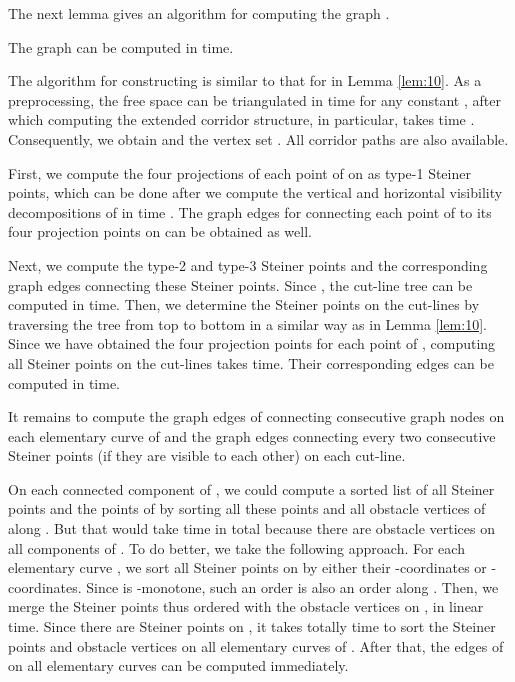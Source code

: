 \documentclass[english,runningheads,11pt]{llncs}
\newenvironment{proof}{\noindent {\textbf{Proof:}}\rm}{\hfill \rm}
\begin{document}
The next lemma gives an algorithm for computing the graph .

\begin{lemma}\label{lem:50}
The graph  can be computed in
 time.
\end{lemma}
\begin{proof}
The algorithm for constructing  is similar to that for  in Lemma \ref{lem:10}.
As a preprocessing, the free space  can be triangulated in
 time for any constant 
\cite{ref:Bar-YehudaTr94}, after which computing the extended corridor
structure, in particular, takes  time
\cite{ref:ChenA11ESA,ref:ChenCo12arXiv,ref:ChenL113STACS}.
Consequently, we obtain
 and the vertex set . All corridor paths are also available.

First, we compute the four projections of each point of
 on  as type-1 Steiner points, which can be
done after we compute the vertical and horizontal visibility
decompositions of  in  time
\cite{ref:Bar-YehudaTr94}. The graph edges for connecting each point
of  to its four projection points on  can
be obtained as well.

Next, we compute the type-2 and type-3 Steiner points and the corresponding graph edges
connecting these Steiner points. Since , the
cut-line tree  can be computed in  time.
Then, we determine the Steiner points on the cut-lines by traversing the tree  from top to bottom in a similar way as in Lemma \ref{lem:10}. Since we have obtained the four projection points for each point of , computing all Steiner
points on the cut-lines takes 
time. Their corresponding edges can be computed in  time.

It remains to compute the graph edges of  connecting consecutive
graph nodes on each elementary curve of  and the graph edges connecting
every two consecutive Steiner points (if they are visible to each other)
on each cut-line.

On each connected component  of , we could compute a sorted
list of all Steiner points and the points of 
by sorting all these points and all obstacle
vertices of  along . But that would take  time
in total because there are  obstacle vertices on all components
of . To do better, we take the following approach. For
each elementary curve , we sort all Steiner points on  by either their
-coordinates or -coordinates. Since  is -monotone,
such an order is also an order along . Then, we merge
the Steiner points thus ordered with the obstacle vertices on ,
in linear time. Since there are  Steiner points on
, it takes totally  time to sort the
Steiner points and obstacle vertices on all elementary curves of
. After that, the edges of  on all elementary
curves can be computed immediately.


\end{proof}
\end{document}

